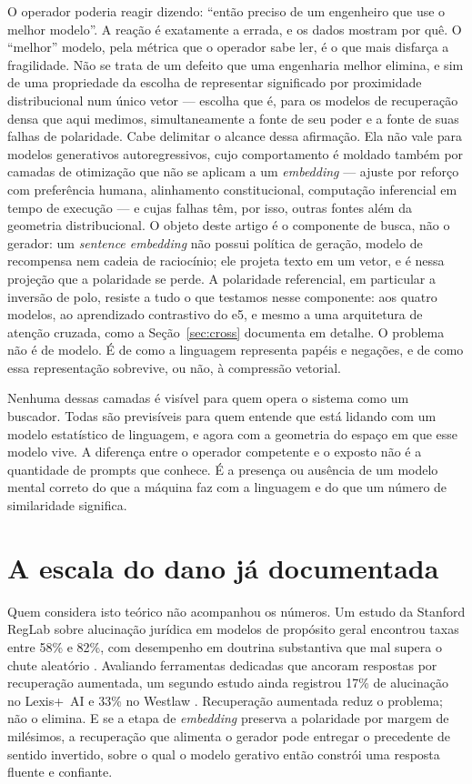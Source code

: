 \documentclass[11pt]{article}
\begin{document}
O operador poderia reagir dizendo: ``então preciso de um engenheiro que use o
melhor modelo''. A reação é exatamente a errada, e os dados mostram por quê. O
``melhor'' modelo, pela métrica que o operador sabe ler, é o que mais disfarça a
fragilidade. Não se trata de um defeito que uma engenharia melhor elimina, e sim
de uma propriedade da escolha de representar significado por proximidade
distribucional num único vetor --- escolha que é, para os modelos de recuperação
densa que aqui medimos, simultaneamente a fonte de seu poder e a fonte de suas
falhas de polaridade. Cabe delimitar o alcance dessa afirmação. Ela não vale para
modelos generativos autoregressivos, cujo comportamento é moldado também por
camadas de otimização que não se aplicam a um \textit{embedding} --- ajuste por
reforço com preferência humana, alinhamento constitucional, computação inferencial
em tempo de execução --- e cujas falhas têm, por isso, outras fontes além da
geometria distribucional. O objeto deste artigo é o componente de busca, não o
gerador: um \textit{sentence embedding} não possui política de geração, modelo de
recompensa nem cadeia de raciocínio; ele projeta texto em um vetor, e é nessa
projeção que a polaridade se perde. A polaridade referencial, em particular a
inversão de polo, resiste a tudo o que testamos nesse componente: aos quatro
modelos, ao aprendizado contrastivo do e5, e mesmo a uma arquitetura de atenção
cruzada, como a Seção~\ref{sec:cross} documenta em detalhe. O problema não é de
modelo. É de como a linguagem representa papéis e negações, e de como essa
representação sobrevive, ou não, à compressão vetorial.

Nenhuma dessas camadas é visível para quem opera o sistema como um buscador.
Todas são previsíveis para quem entende que está lidando com um modelo estatístico
de linguagem, e agora com a geometria do espaço em que esse modelo vive. A
diferença entre o operador competente e o exposto não é a quantidade de prompts
que conhece. É a presença ou ausência de um modelo mental correto do que a máquina
faz com a linguagem e do que um número de similaridade significa.

\section{A escala do dano já documentada}

Quem considera isto teórico não acompanhou os números. Um estudo da Stanford
RegLab sobre alucinação jurídica em modelos de propósito geral encontrou taxas
entre 58\% e 82\%, com desempenho em doutrina substantiva que mal supera o chute
aleatório \cite{dahl2024}. Avaliando ferramentas dedicadas que ancoram respostas
por recuperação aumentada, um segundo estudo ainda registrou 17\% de alucinação no
Lexis+~AI e 33\% no Westlaw \cite{magesh2025}. Recuperação aumentada reduz o
problema; não o elimina. E se a etapa de \textit{embedding} preserva a polaridade
por margem de milésimos, a recuperação que alimenta o gerador pode entregar o
precedente de sentido invertido, sobre o qual o modelo gerativo então constrói uma
resposta fluente e confiante.
\end{document}
